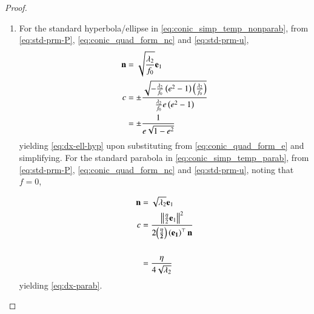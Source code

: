 \begin{enumerate}[label=\thesubsection.\arabic*.,ref=\thesubsection.\theenumi]
\begin{enumerate}
		\end{enumerate}
    
	\begin{proof}%
  \label{app:foc-dir}
%  
		\begin{enumerate}
			\item For the standard hyperbola/ellipse in \eqref{eq:conic_simp_temp_nonparab}, from 
					\eqref{eq:std-prm-P},
\eqref{eq:conic_quad_form_nc}
and 
					\eqref{eq:std-prm-u},
				\begin{align}
\label{eq:n-ell-hyp}
					\mathbf{n} &= \sqrt{\frac{\lambda_2}{f_0}} \mathbf{e}_1 
					\\
					c &= 
					\pm \frac{\sqrt{-\frac{\lambda_2}{f_0}\left(e^2-1\right)\left(\frac{\lambda_2}{ f_0}\right)}}{\frac{\lambda_2}{f_0}e\left(e^2-1\right)}
					\\
					&=\pm \frac{1}{e\sqrt{1-e^2}}
\label{eq:c-ell-hyp}
				\end{align}
				yielding 
					\eqref{eq:dx-ell-hyp} upon substituting from 
\eqref{eq:conic_quad_form_e} and simplifying.
For the standard parabola in \eqref{eq:conic_simp_temp_parab},  from 
					\eqref{eq:std-prm-P},
\eqref{eq:conic_quad_form_nc}
and 
					\eqref{eq:std-prm-u}, noting that $f = 0$,

				\begin{align}
\label{eq:n-parab}
					\mathbf{n} &= \sqrt{\lambda_2} \mathbf{e}_1 
					\\
					c &=
	\frac{\left\lVert\frac{\eta}{2} \mathbf{e}_1\right\rVert^2   }{2\mathbf{\left(\frac{\eta}{2}\right) \left(\mathbf{e}_1\right)^{\top}\mathbf{n}}} 
\\
					\\
					&= \frac{\eta}{4\sqrt{\lambda_2}}
\label{eq:c-parab}
				\end{align}
				yielding 
					\eqref{eq:dx-parab}.


\end{enumerate}
\end{proof}
\end{enumerate}
